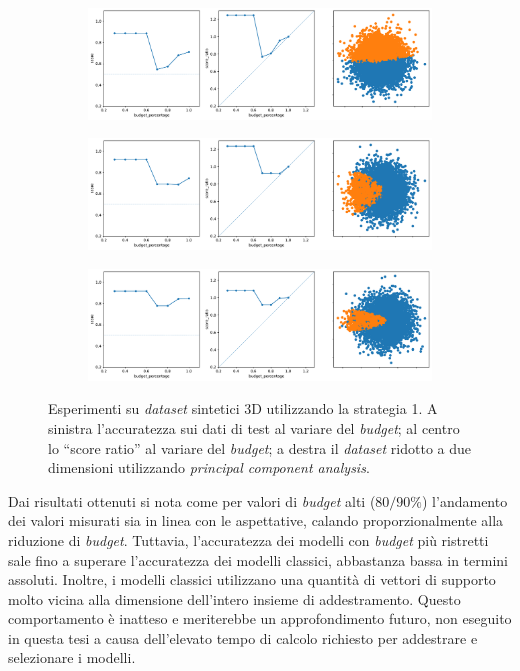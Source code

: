 \begin{figure}
    \begin{subfigure}{\textwidth}
        \centering
        \includegraphics[width=\textwidth]{img/3d/1.pdf}
    \end{subfigure}%
    \hfill
    \begin{subfigure}{\textwidth}
        \centering
        \includegraphics[width=\textwidth]{img/3d/2.pdf}
    \end{subfigure}%
    \hfill
    \begin{subfigure}{\textwidth}
        \centering
        \includegraphics[width=\textwidth]{img/3d/3.pdf}
    \end{subfigure}%
\caption{Esperimenti su \emph{dataset} sintetici 3D utilizzando la strategia 1. A sinistra l'accuratezza sui dati di test al variare del \emph{budget}; al centro lo ``score ratio'' al variare del \emph{budget}; a destra il \emph{dataset} ridotto a due dimensioni utilizzando \emph{principal component analysis}.}
\label{fig:3d_exp}
\end{figure}
Dai risultati ottenuti si nota come per valori di \emph{budget} alti ($80/90\%$) l'andamento dei valori misurati sia in linea con le aspettative, calando proporzionalmente alla riduzione di \emph{budget}.
Tuttavia, l'accuratezza dei modelli con \emph{budget} più ristretti sale fino a superare l'accuratezza dei modelli classici, abbastanza bassa in termini assoluti.
Inoltre, i modelli classici utilizzano una quantità di vettori di supporto molto vicina alla dimensione dell'intero insieme di addestramento.
Questo comportamento è inatteso e meriterebbe un approfondimento futuro, non eseguito in questa tesi a causa dell'elevato tempo di calcolo richiesto per addestrare e selezionare i modelli.

